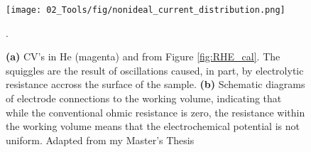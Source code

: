 \begin{figure}[h!]
	\texttt{[image: 02\_Tools/fig/nonideal\_current\_distribution.png]}
	\caption{\textbf{(a)} CV's in He (magenta) and  from Figure \ref{fig:RHE_cal}. The squiggles are the result of oscillations caused, in part, by electrolytic resistance accross the surface of the sample. \textbf{(b)} Schematic diagrams of electrode connections to the working volume, indicating that while the conventional ohmic resistance is zero, the resistance within the working volume means that the electrochemical potential is not uniform. Adapted from my Master's Thesis\cite{Scott2016_MSc}}.
	\label{fig:current_distribution}
\end{figure}

